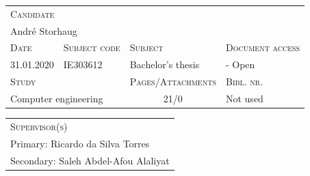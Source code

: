 \noindent
\begin{tabularx}{\textwidth}{ |l|l|X|X| }
	\hline
	\multicolumn{4}{|l|}{\scshape{Candidate}}\\
	\multicolumn{4}{|l|}{André Storhaug}\\
  	\hline
  	\scshape{Date} & \scshape{Subject code} & \scshape{Subject} & \scshape{Document access} \\
  	31.01.2020 & IE303612 & Bachelor's thesis & - Open \\
  	\hline
	\multicolumn{2}{|l|}{\scshape{Study}} & \scshape{Pages/Attachments} & \scshape{Bibl. nr.}\\
	\multicolumn{2}{|l|}{Computer engineering} & \multicolumn{1}{c|}{21/0} & Not used \\
  	\hline 
\end{tabularx}
\vspace{1em}

\noindent
\begin{tabularx}{\textwidth}{ |X| }
	\hline
	\scshape{Supervisor(s)}\\
	Primary: Ricardo da Silva Torres\\
	Secondary: Saleh Abdel-Afou Alaliyat\\
  	\hline 
\end{tabularx}

\noindent


\restoregeometry
